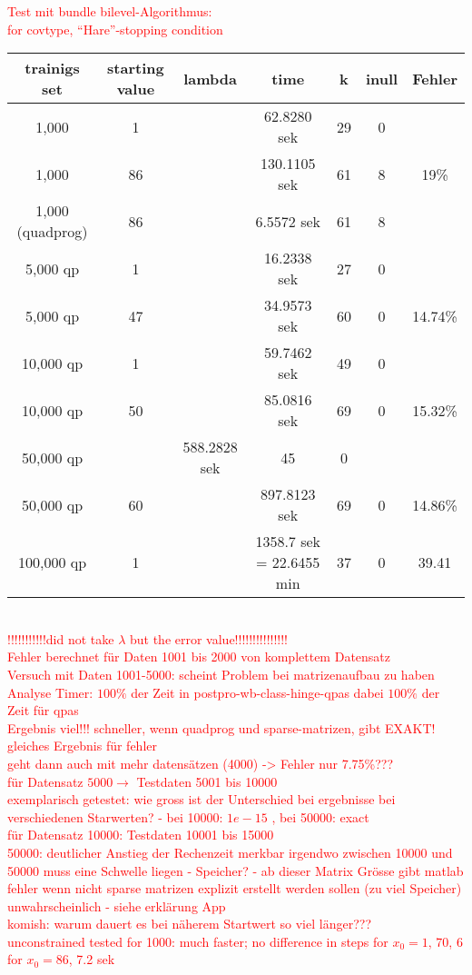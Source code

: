 \textcolor{red}{Test mit bundle bilevel-Algorithmus:\\
for covtype, ``Hare''-stopping condition\\
\begin{tabular}{c|c|c|c|c|c|c}
trainigs set & starting value & lambda & time & k & inull & Fehler\\
\hline
1,000 & 1 &  & 62.8280 sek & 29 & 0 & \\
1,000 & 86 &  & 130.1105 sek & 61 & 8 & 19\% \\
1,000 (quadprog) & 86 & & 6.5572 sek & 61 & 8 & \\
5,000 qp & 1 &  & 16.2338 sek & 27 & 0 & \\
5,000 qp & 47 &  & 34.9573 sek & 60 & 0 & 14.74\% \\
10,000 qp & 1 &  & 59.7462 sek & 49 & 0 & \\
10,000 qp & 50 &  & 85.0816 sek & 69 & 0 & 15.32\% \\
50,000 qp &  & 588.2828 sek & 45 & 0 & \\
50,000 qp & 60 &  & 897.8123 sek & 69 & 0 & 14.86\% \\
100,000 qp & 1 &  & 1358.7 sek = 22.6455 min & 37 & 0 & 39.41
\end{tabular}
\\
!!!!!!!!!!!did not take \(\lambda\) but the error value!!!!!!!!!!!!!!!\\
Fehler berechnet f\"ur Daten 1001 bis 2000 von komplettem Datensatz\\
Versuch mit Daten 1001-5000: scheint Problem bei matrizenaufbau zu haben \\
Analyse Timer: \(100\%\) der Zeit in postpro-wb-class-hinge-qpas dabei \(100\%\) der Zeit für qpas\\
Ergebnis viel!!! schneller, wenn quadprog und sparse-matrizen, gibt EXAKT! gleiches Ergebnis für fehler\\
geht dann auch mit mehr datens\"atzen (4000) -> Fehler nur 7.75\%??? \\
f\"ur Datensatz \( 5000 \to\) Testdaten 5001 bis 10000 \\
exemplarisch getestet: wie gross ist der Unterschied bei ergebnisse bei verschiedenen Starwerten? - bei 10000: \(1e-15\) , bei 50000: exact\\
f\"ur Datensatz 10000: Testdaten 10001 bis 15000 \\
50000: deutlicher Anstieg der Rechenzeit merkbar irgendwo zwischen 10000 und 50000 muss eine Schwelle liegen - Speicher? - ab dieser Matrix Gr\"osse gibt matlab fehler wenn nicht sparse matrizen explizit erstellt werden sollen (zu viel Speicher) unwahrscheinlich - siehe erkl\"arung App \\
komish: warum dauert es bei n\"aherem Startwert so viel l\"anger??? \\
unconstrained tested for 1000: much faster; no difference in steps for \(x_0 = 1\), 70, 6 for \(x_0=86\), 7.2 sek}

